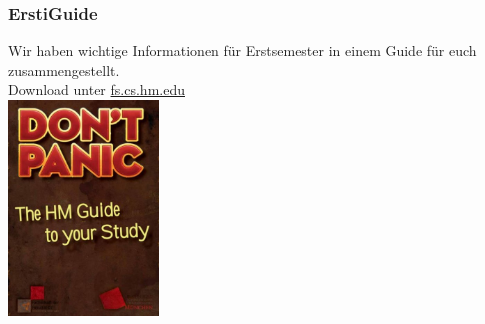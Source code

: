 \documentclass{beamer}
\begin{document}
    \begin{frame}[t]
    	\frametitle{ErstiGuide}
    	Wir haben wichtige Informationen für Erstsemester in einem Guide für euch zusammengestellt.\\
    	\bigskip
    	Download unter \url{fs.cs.hm.edu}\\
    	\center
    	\includegraphics[width=0.3\textwidth]{erstiguide.jpg}
    \end{frame}
    
\end{document}
